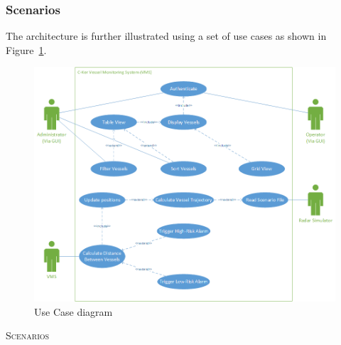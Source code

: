 \documentclass[12pt]{article}
\begin{document}
\subsubsection{Scenarios}

The architecture is further illustrated using a set of use cases as shown in Figure~\ref{fig:UseCaseDiagram}.
\begin{figure}[h!]
    \centering
    \includegraphics[scale=0.65]{UCD}
    \caption{Use Case diagram}
    \label{fig:UseCaseDiagram}
\end{figure}
\clearpage

\vspace*{0.2in}
\centerline{\textsc{Scenarios}}
\vspace*{0.2in}
\end{document}
